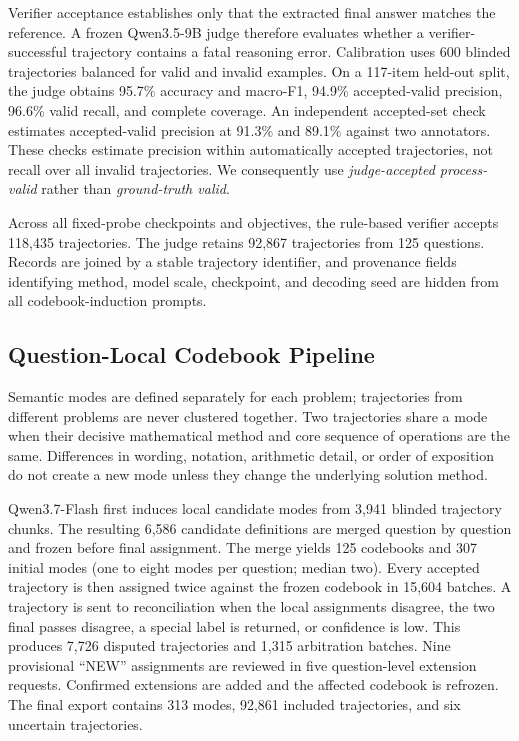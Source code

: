 \documentclass[letterpaper]{article}
\begin{document}
Verifier acceptance establishes only that the extracted final answer matches
the reference.  A frozen Qwen3.5-9B judge
\citep{alibaba2026modelstudio} therefore evaluates whether a
verifier-successful trajectory contains a fatal reasoning error.  Calibration
uses 600 blinded trajectories balanced for valid and invalid examples.  On a
117-item held-out split, the judge obtains 95.7\% accuracy and macro-F1,
94.9\% accepted-valid precision, 96.6\% valid recall, and complete coverage.
An independent accepted-set check estimates accepted-valid precision at
91.3\% and 89.1\% against two annotators.  These checks estimate precision
within automatically accepted trajectories, not recall over all invalid
trajectories.  We consequently use \emph{judge-accepted process-valid} rather
than \emph{ground-truth valid}.

Across all fixed-probe checkpoints and objectives, the rule-based verifier
accepts 118,435 trajectories.  The judge retains 92,867 trajectories from 125
questions.  Records are joined by a stable trajectory identifier, and
provenance fields identifying method, model scale, checkpoint, and decoding
seed are hidden from all codebook-induction prompts.

\subsection{Question-Local Codebook Pipeline}

Semantic modes are defined separately for each problem; trajectories from
different problems are never clustered together.  Two trajectories share a
mode when their decisive mathematical method and core sequence of operations
are the same.  Differences in wording, notation, arithmetic detail, or order
of exposition do not create a new mode unless they change the underlying
solution method.

Qwen3.7-Flash \citep{alibaba2026modelstudio} first induces local candidate
modes from 3,941 blinded trajectory chunks.  The resulting 6,586 candidate
definitions are merged question by question and frozen before final
assignment.  The merge yields 125 codebooks and 307 initial modes (one to
eight modes per question; median two).  Every accepted trajectory is then
assigned twice against the frozen codebook in 15,604 batches.  A trajectory is
sent to reconciliation when the local assignments disagree, the two final
passes disagree, a special label is returned, or confidence is low.  This
produces 7,726 disputed trajectories and 1,315 arbitration batches.  Nine
provisional ``NEW'' assignments are reviewed in five question-level extension
requests.  Confirmed extensions are added and the affected codebook is
refrozen.  The final export contains 313 modes, 92,861 included trajectories,
and six uncertain trajectories.
\end{document}
